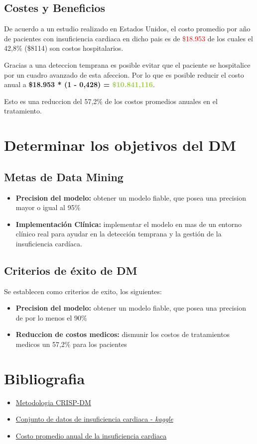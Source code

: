 \documentclass[12pt, letterpaper, spanish]{article}
\begin{document}
\subsection{Costes y Beneficios}
De acuerdo a un estudio realizado en Estados Unidos, el costo promedio por año de pacientes
con insuficiencia cardiaca en dicho pais es de \textcolor{red}{\$18.953} de los cuales el 
42,8\% (\$8114) son costos hospitalarios.

Gracias a una deteccion temprana es posible evitar que el paciente se hospitalice por 
un cuadro avanzado de esta afeccion. Por lo que es posible reducir el costo anual a 
\textbf{\$18.953 * (1 - 0,428) = \textcolor{YellowGreen}{\$10.841,116}}.

Esto es una reduccion del 57,2\% de los costos promedios anuales en el tratamiento.

\section{Determinar los objetivos del DM}
\subsection{Metas de Data Mining}
\begin{itemize}
  \item{\textbf{Precision del modelo: }obtener un modelo fiable, que posea una precision 
  mayor o igual al 95\% }
  \item{\textbf{Implementación Clínica: }implementar el modelo en mas de un entorno clínico real 
  para ayudar en la detección temprana y la gestión de la insuficiencia cardíaca.}
\end{itemize}
\subsection{Criterios de éxito de DM}
Se establecen como criterios de exito, los siguientes:
\begin{itemize}
  \item{\textbf{Precision del modelo: }obtener un modelo fiable, que posea una precision de
  por lo menos el 90\% }
  \item{\textbf{Reduccion de costos medicos: }dismunir los costos de tratamientos medicos 
  un 57,2\% para los pacientes}
\end{itemize}

\section{Bibliografia}
\begin{itemize}
    \item \href{https://www.sngular.com/es/crisp-dm-fase-i-comprension-del-negocio/?authuser=0}
    {Metodologia CRISP-DM}
    \item \href{https://www.kaggle.com/datasets/fedesoriano/heart-failure-prediction}
    {Conjunto de datos de insuficiencia cardiaca - \emph{kaggle}}
    \item \href{https://www.ncbi.nlm.nih.gov/pmc/articles/PMC8730466/}{Costo promedio anual de la insuficiencia cardiaca}
\end{itemize}
\end{document}
